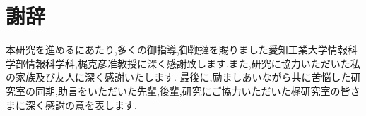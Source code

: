 \chapter*{謝辞}
本研究を進めるにあたり,多くの御指導,御鞭撻を賜りました愛知工業大学情報科学部情報科学科,梶克彦准教授に深く感謝致します.また,研究に協力いただいた私の家族及び友人に深く感謝いたします.
最後に,励ましあいながら共に苦悩した研究室の同期,助言をいただいた先輩,後輩,研究にご協力いただいた梶研究室の皆さまに深く感謝の意を表します.
